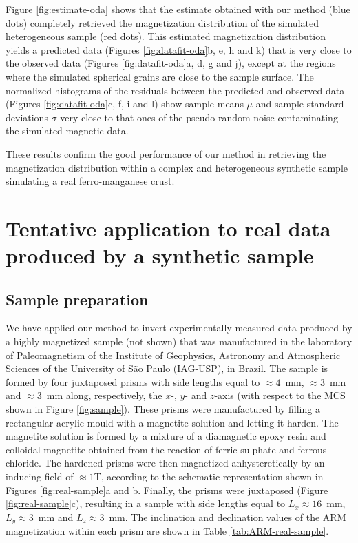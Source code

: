 \documentclass[draft,gc]{agutex}
\begin{document}
\begin{article}
Figure \ref{fig:estimate-oda} shows that the estimate
obtained with our method (blue dots) completely retrieved the 
magnetization distribution of the simulated heterogeneous 
sample (red dots).
This estimated magnetization distribution yields a predicted data
(Figures \ref{fig:datafit-oda}b, e, h and k) that is very
close to the observed data (Figures \ref{fig:datafit-oda}a, 
d, g and j), except at the regions where the simulated spherical
grains are close to the sample surface.
The normalized histograms of the residuals between the predicted and
observed data (Figures \ref{fig:datafit-oda}c, f, i and l) show
sample means $\mu$ and sample standard deviations $\sigma$
very close to that ones of the pseudo-random noise 
contaminating the simulated magnetic data.

These results confirm the good performance of our method
in retrieving the magnetization distribution within a complex and
heterogeneous synthetic sample simulating a real ferro-manganese
crust.

\section{Tentative application to real data produced by a synthetic sample}
\label{sec:Tentative application to real data produced by a synthetic sample}

\subsection{Sample preparation}
\label{subsec:Sample preparation}

We have applied our method to invert experimentally measured
data produced by a highly magnetized sample (not shown) 
that was manufactured in the laboratory of Paleomagnetism of the
Institute of Geophysics, Astronomy and Atmospheric Sciences of the
University of S\~{a}o Paulo (IAG-USP), in Brazil.
The sample is formed by four juxtaposed prisms with side lengths
equal to $\approx 4$~mm, $\approx 3$~mm and $\approx 3$~mm along, 
respectively, the $x$-,
$y$- and $z$-axis (with respect to the MCS shown in Figure 
\ref{fig:sample}).
These prisms were manufactured by filling a rectangular 
acrylic mould with a magnetite solution and letting it harden.
The magnetite solution is formed by a mixture of a diamagnetic 
epoxy resin and colloidal magnetite obtained from the
reaction of ferric sulphate and ferrous chloride.
The hardened prisms were then magnetized anhysteretically
by an inducing field of $\approx 1$T, according to the
schematic representation shown in Figures 
\ref{fig:real-sample}a and b.
Finally, the prisms were juxtaposed (Figure \ref{fig:real-sample}c),
resulting in a sample with side lengths equal to
$L_{x} \approx 16$~mm, $L_{y} \approx 3$~mm and 
$L_{z} \approx 3$~mm. The inclination and declination values 
of the ARM magnetization within each prism
are shown in Table \ref{tab:ARM-real-sample}.


\end{article}
\end{document}
